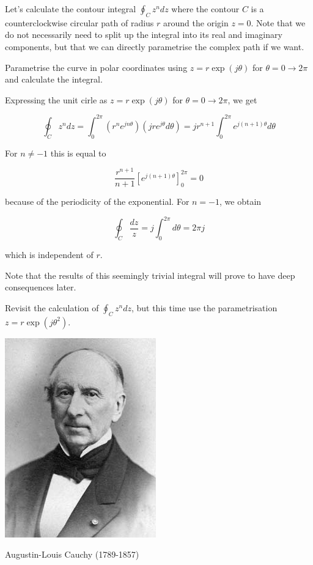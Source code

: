Let's calculate the contour integral $\oint_{C}z^ndz$ where the contour ${C}$ is a counterclockwise circular path of radius $r$ around the origin $z=0$. Note that we do not necessarily need to split up the integral into its real and imaginary components, but that we can directly parametrise the complex path if we want.

\begin{cue}
Parametrise the curve in polar coordinates using $z=r\exp(j\theta)$ for $\theta=0\to 2 \pi$ and calculate the integral. 
\end{cue}

Expressing the unit cirle as $z=r\exp(j\theta)$ for $\theta=0\to 2 \pi$, we get

$$\oint_{C} z^n dz = \int_0^{2\pi} \left(r^n e^{jn\theta}\right) \left(jr e^{j \theta}d \theta\right)=j r^{n+1} \int_0^{2\pi} e^{j(n+1)\theta} d \theta $$

For $n \neq -1$ this is equal to

$$ \frac{r^{n+1}}{n+1}\left[e^{j(n+1)\theta}\right]_0^{2\pi}=0 $$

because of the periodicity of the exponential. For $n=-1$, we obtain 

$$ \oint_{C} \frac{dz}{z} = j \int_0^{2\pi} d \theta = 2 \pi j $$

which is independent of $r$.

Note that the results of this seemingly trivial integral will prove to have deep consequences later.

\begin{exer}
Revisit the calculation of  $\oint_{C}z^ndz$, but this time use the parametrisation  $z=r\exp(j\theta^2)$. 
\end{exer}


\pagebreak



\begin{marginfigure}[+0.3cm]
  \includegraphics{complex/figures/cauchy}
  \caption{Augustin-Louis Cauchy (1789-1857)}
\end{marginfigure}

